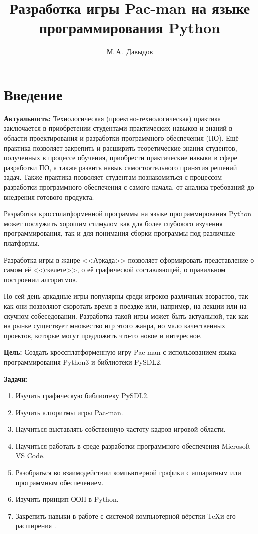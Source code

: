 \documentclass[14pt, oneside]{altsu-report}
\title{Разработка игры Pac-man на языке программирования Python}
\author{М.\,А.~Давыдов}
\institute{Институт цифровых технологий, электроники и физики}
\date{\the\year}
\begin{document}
\maketitle

\setcounter{page}{2}
\makeabstract
\tableofcontents

\chapter*{Введение}

\textbf{Актуальность:}
Технологическая (проектно-технологическая) практика заключается в приобретении студентами практических навыков и знаний в области проектирования и разработки программного обеспечения (ПО). Ещё практика позволяет закрепить и расширить теоретические знания студентов, полученных в процессе обучения, приобрести практические навыки в сфере разработки ПО, а также развить навык самостоятельного принятия решений задач. Также практика позволяет студентам познакомиться с процессом разработки программного обеспечения с самого начала, от анализа требований до внедрения готового продукта.

Разработка кроссплатформенной программы на языке программирования Python может послужить хорошим стимулом как для более глубокого изучения программирования, так и для понимания сборки программы под различные платформы.

Разработка игры в жанре <<Аркада>> позволяет сформировать представление о самом её <<скелете>>, о её графической составляющей, о правильном построении алгоритмов.

По сей день аркадные игры популярны среди игроков различных возрастов, так как они позволяют скоротать время в поездке или, например, на лекции или на скучном собеседовании. Разработка такой игры может быть актуальной, так как на рынке существует множество игр этого жанра, но мало качественных проектов, которые могут предложить что-то новое и интересное.

\textbf{Цель:}
Создать кроссплатформенную игру Pac-man с использованием языка программирования Python3 и библиотеки PySDL2.

\textbf{\label{zadachi}Задачи:}
\begin{enumerate}
	\item Изучить графическую библиотеку PySDL2.
	\item Изучить алгоритмы игры Pac-man.
	\item Научиться выставлять собственную частоту кадров игровой области.
	\item Научиться работать в среде разработки программного обеспечения Microsoft VS Code.
	\item Разобраться во взаимодействии компьютерной графики с аппаратным или программным обеспечением.
	\item Изучить принцип ООП в Python.
	\item Закрепить навыки в работе с системой компьютерной вёрстки \TeX и его расширения \XeTeX.
\end{enumerate}
\end{document}
